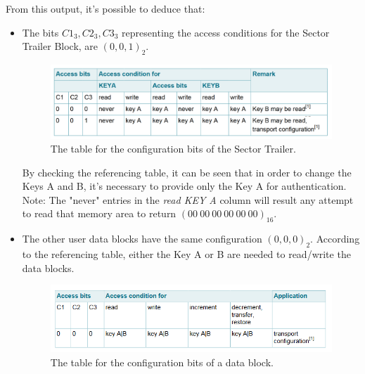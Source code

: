 \documentclass[target=bach,aauheader=,style=]{thud}
\begin{document}
From this output, it's possible to deduce that:
\begin{itemize}
	\item The bits $C1_3, C2_3, C3_3$ representing the access conditions for the Sector Trailer Block, are $(0, 0, 1)_2$.
	\begin{figure}[h]
		\centering
		\includegraphics[scale=0.5]{sectortrailerblockconfigurations} %
		\caption{The table for the configuration bits of the Sector Trailer.}
		\label{fig:sectortrailerblockconfigurations}
	\end{figure}
	By checking the referencing table, it can be seen that in order to change the Keys A and B, it's necessary to provide only the Key A for authentication.\\
	Note: The "never" entries in the \emph{read KEY A} column will result any attempt to read that memory area to return $(00\ 00\ 00\ 00\ 00\ 00)_{16}$.
	
	\item The other user data blocks have the same configuration $(0, 0, 0)_2$. According to the referencing table, either the Key A or B are needed to read/write the data blocks.
		\begin{figure}[h!]
		\centering
		\includegraphics[scale=0.8]{blockconfigurations} %
		\caption{The table for the configuration bits of a data block.}
		\label{fig:blockconfigurations}
		\end{figure}
\end{itemize}
\end{document}
